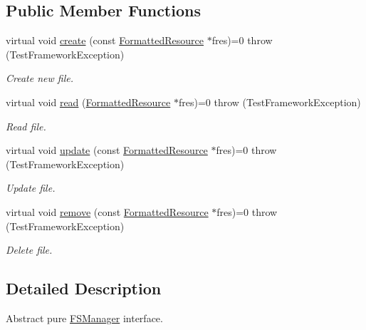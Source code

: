 \subsection*{Public Member Functions}
\begin{DoxyCompactItemize}
\item 
virtual void \hyperlink{classit_1_1testbench_1_1ioutil_1_1FSManager_ac6f45e94bd105d16d09e926b9eb290eb}{create} (const \hyperlink{structit_1_1testbench_1_1data_1_1FormattedResource}{Formatted\-Resource} $\ast$fres)=0  throw (\-Test\-Framework\-Exception)
\begin{DoxyCompactList}\small\item\em Create new file. \end{DoxyCompactList}\item 
virtual void \hyperlink{classit_1_1testbench_1_1ioutil_1_1FSManager_a80ffde9a89e671453fd2c44941d5ac46}{read} (\hyperlink{structit_1_1testbench_1_1data_1_1FormattedResource}{Formatted\-Resource} $\ast$fres)=0  throw (\-Test\-Framework\-Exception)
\begin{DoxyCompactList}\small\item\em Read file. \end{DoxyCompactList}\item 
virtual void \hyperlink{classit_1_1testbench_1_1ioutil_1_1FSManager_a88acc0f8998e26cd947b722f18feac13}{update} (const \hyperlink{structit_1_1testbench_1_1data_1_1FormattedResource}{Formatted\-Resource} $\ast$fres)=0  throw (\-Test\-Framework\-Exception)
\begin{DoxyCompactList}\small\item\em Update file. \end{DoxyCompactList}\item 
virtual void \hyperlink{classit_1_1testbench_1_1ioutil_1_1FSManager_aff3682f18dbef185c999d1a60c853d14}{remove} (const \hyperlink{structit_1_1testbench_1_1data_1_1FormattedResource}{Formatted\-Resource} $\ast$fres)=0  throw (\-Test\-Framework\-Exception)
\begin{DoxyCompactList}\small\item\em Delete file. \end{DoxyCompactList}\end{DoxyCompactItemize}


\subsection{Detailed Description}
Abstract pure \hyperlink{classit_1_1testbench_1_1ioutil_1_1FSManager}{F\-S\-Manager} interface. 

